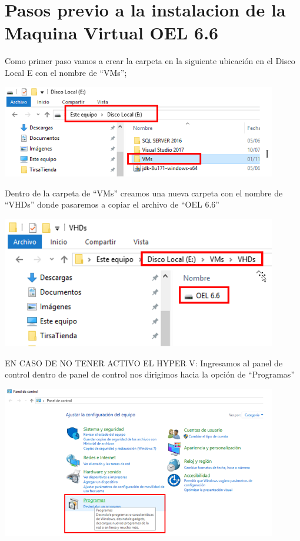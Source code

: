 \section{Pasos previo a la instalacion de la Maquina Virtual OEL 6.6} 
 Como primer paso vamos a crear la carpeta en la siguiente ubicación en el Disco Local E con el nombre de “VMs”;
	\begin{center}
		\includegraphics[width=12cm]{./Imagenes/1} 
	\end{center}

\vspace{\baselineskip}
\vspace{\baselineskip}

 Dentro de la carpeta de “VMs” creamos una nueva carpeta con el nombre de “VHDs” donde pasaremos a copiar el archivo de “OEL 6.6”
 	\begin{center}
 		\includegraphics[width=12cm]{./Imagenes/2} 
 	\end{center}
 
 \vspace{\baselineskip}
 
 EN CASO DE NO TENER ACTIVO EL HYPER V: 
 Ingresamos al panel de control dentro de panel de control nos dirigimos hacia la opción de “Programas” 
  	\begin{center}
 	\includegraphics[width=12cm]{./Imagenes/3} 
 	\end{center}
 

